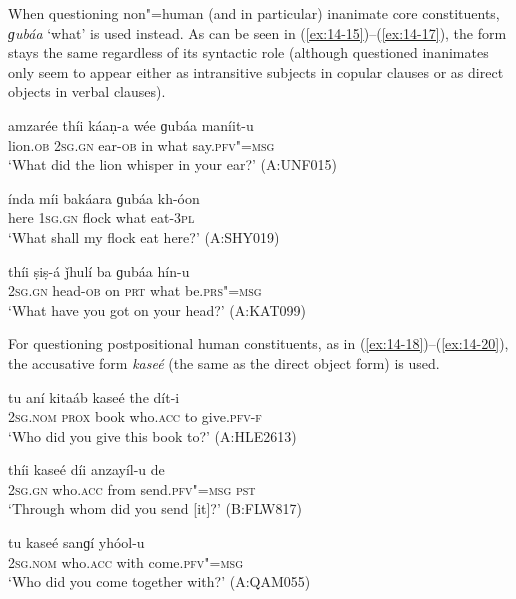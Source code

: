 When questioning non"=human (and in particular) inanimate core constituents, \textit{ɡubáa} `what' is used instead. As can be seen in (\ref{ex:14-15})--(\ref{ex:14-17}), the form stays the same regardless of its syntactic role (although questioned inanimates only seem to appear either as intransitive subjects in copular clauses or as direct objects in verbal clauses).

\begin{exe}
\ex
\label{ex:14-15}
\gll amzarée thíi káaṇ-a wée ɡubáa maníit-u \\
lion.\textsc{ob} \textsc{2sg.gn} ear-\textsc{ob} in what say.\textsc{pfv"=msg} \\
\glt `What did the lion whisper in your ear?' (A:UNF015)

\ex
\label{ex:14-16}
\gll índa míi bakáara ɡubáa kh-óon \\
here \textsc{1sg.gn} flock what eat-\textsc{3pl} \\
\glt `What shall my flock eat here?' (A:SHY019)

\ex
\label{ex:14-17}
\gll thíi ṣiṣ-á ǰhulí ba ɡubáa hín-u \\
\textsc{2sg.gn} head-\textsc{ob} on \textsc{prt} what be.\textsc{prs"=msg} \\
\glt `What have you got on your head?' (A:KAT099)
\end{exe}

 For questioning postpositional human constituents, as in (\ref{ex:14-18})--(\ref{ex:14-20}), the accusative form \textit{kaseé} (the same as the direct object form) is used.

\begin{exe}
\ex
\label{ex:14-18}
\gll tu aní kitaáb kaseé the dít-i \\
\textsc{2sg.nom} \textsc{prox} book who.\textsc{acc} to give.\textsc{pfv-f} \\
\glt `Who did you give this book to?' (A:HLE2613)

\ex
\label{ex:14-19}
\gll thíi kaseé díi anzayíl-u de \\
\textsc{2sg.gn} who.\textsc{acc} from send.\textsc{pfv"=msg} \textsc{pst} \\
\glt `Through whom did you send [it]?' (B:FLW817)

\ex
\label{ex:14-20}
\gll tu kaseé sanɡí yhóol-u \\
\textsc{2sg.nom} who.\textsc{acc} with come.\textsc{pfv"=msg} \\
\glt `Who did you come together with?' (A:QAM055)
\end{exe}

